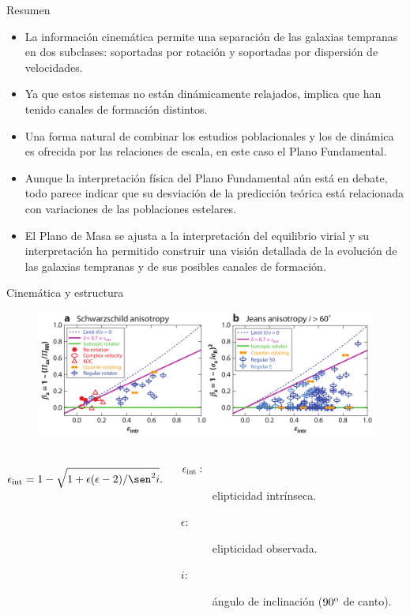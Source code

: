 \documentclass[xcolor=dvipsnames,4pt]{beamer}
\newenvironment{changemargin}[2]{%
  \begin{list}{}{%
    \setlength{\topsep}{0pt}%
    \setlength{\leftmargin}{#1}%
    \setlength{\rightmargin}{#2}%
    \setlength{\listparindent}{\parindent}%
    \setlength{\itemindent}{\parindent}%
    \setlength{\parsep}{\parskip}%
  }%
\item[]}{\end{list}}
\begin{document}
\begin{frame}{Resumen}
\begin{itemize}
\item La información cinemática permite una separación de las galaxias tempranas en dos subclases: \alert{soportadas por rotación y soportadas por dispersión de velocidades}.
\item Ya que estos sistemas no están dinámicamente relajados, implica que han tenido canales de formación distintos.
\item Una forma natural de combinar los estudios poblacionales y los de dinámica es ofrecida por las relaciones de escala, en este caso el Plano Fundamental.
\item Aunque la interpretación física del Plano Fundamental aún está en debate, todo parece indicar que su desviación de la predicción teórica está relacionada con variaciones de las poblaciones estelares.
\item El Plano de Masa se ajusta a la interpretación del equilibrio virial y su interpretación ha permitido construir una visión detallada de la evolución de las galaxias tempranas y de sus posibles canales de formación.
\end{itemize}
\end{frame}

\begin{frame}{Cinemática y estructura}
\begin{changemargin}{-1cm}{-1cm}
\begin{figure}
\includegraphics[scale=0.67]{img/dinamic.png}
\end{figure}

\begin{columns}
\small
{}
$$
\epsilon_{\rm int} = 1 - \sqrt{1+\epsilon(\epsilon-2)/\sen^2{i}}.
$$
\begin{description}
\item[{\color{teal}$\epsilon_{\rm int}:$}] elipticidad intrínseca.
\item[{\color{teal}$\epsilon:$}] elipticidad observada.
\item[{\color{teal}$i:$}] ángulo de inclinación ($90^{\rm o}$ de canto).
\end{description}
\end{columns}
\end{changemargin}

\end{frame}
\end{document}
